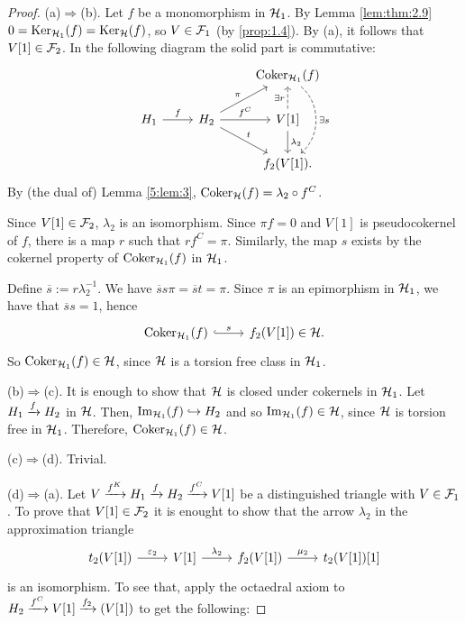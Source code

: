 \begin{proof}
  (a)$\Rightarrow$(b). Let $f$ be a monomorphism in $\mathcal{H}_1$. By Lemma \ref{lem:thm:2.9} $0=\operatorname{Ker}_{\mathcal{H}_1}(f)=\operatorname{Ker}_{\mathcal{H}}(f)$, so $V\in\mathcal{F}_1$ (by \ref{prop:1.4}). By (a), it follows that $V[1]\in\mathcal{F}_2$. In the following diagram the solid part is commutative:
  \begin{equation*}
    \begin{tikzcd}
      & & \Coker_{\clH_1}(f)\arrow[bend left=50,dashed]{dd}{\exists s}\\
      H_1\arrow{r}{f}
      & H_2\arrow{ur}{\pi}\arrow{r}{f^C}\arrow{dr}{t}
        & V[1]\arrow[dashed]{u}{\exists r}\arrow{d}{\lambda_2}\\
      & & f_2(V[1]).
    \end{tikzcd}
  \end{equation*}
  By (the dual of) Lemma \ref{5:lem:3}, $\operatorname{Coker}_{\mathcal{H}}(f)=\lambda_2\circ f^C$.

  Since $V[1]\in\mathcal{F}_2$, $\lambda_2$ is an isomorphism. Since $\pi f =0$ and $V[1]$ is pseudocokernel of $f$, there is a map $r$ such that $rf^C=\pi$. Similarly, the map $s$ exists by the cokernel property of $\operatorname{Coker}_{\mathcal{H}_1}(f)$ in $\mathcal{H}_1$.

  Define $\overline{s}:=r\lambda_2^{-1}$. We have $\overline{s}s\pi=\overline{s}t=\pi$. Since $\pi$ is an epimorphism in $\mathcal{H}_1$, we have that $\overline{s}s=1$, hence
  \begin{equation*}
    \begin{tikzcd}
      \Coker_{\clH_1}(f)\arrow[hook]{r}{s}
      & f_2(V[1])\in\clH.
    \end{tikzcd}
  \end{equation*}
  So $\operatorname{Coker}_{\mathcal{H}_1}(f)\in\mathcal{H}$, since $\mathcal{H}$ is a torsion free class in $\mathcal{H}_1$.

  \smallskip\noindent
  (b)$\Rightarrow$(c). It is enough to show that $\mathcal{H}$ is closed under cokernels in $\mathcal{H}_1$. Let $H_1\xrightarrow{f}H_2$ in $\mathcal{H}$. Then, $\operatorname{Im}_{\mathcal{H}_1}(f)\hookrightarrow H_2$ and so $\operatorname{Im}_{\mathcal{H}_1}(f)\in\mathcal{H}$, since $\mathcal{H}$ is torsion free in $\mathcal{H}_1$. Therefore, $\operatorname{Coker}_{\mathcal{H}_1}(f)\in\mathcal{H}$.

  \smallskip\noindent
  (c)$\Rightarrow$(d). Trivial.

  \smallskip\noindent
  (d)$\Rightarrow$(a). Let $V\xrightarrow{f^K}H_1\xrightarrow{f}H_2\xrightarrow{f^C}V[1]$ be a distinguished triangle with $V\in\mathcal{F}_1$. To prove that $V[1]\in\mathcal{F}_2$ it is enought to show that the arrow $\lambda_2$ in the approximation triangle
  \begin{equation*}
    \begin{tikzcd}
      t_2(V[1])\arrow{r}{\varepsilon_2}
      & V[1]\arrow{r}{\lambda_2}
        & f_2(V[1])\arrow{r}{\mu_2}
          & t_2(V[1])[1]
    \end{tikzcd}
  \end{equation*}
  is an isomorphism. To see that, apply the octaedral axiom to $H_2\xrightarrow{f^C}V[1]\xrightarrow{f_2}(V[1])$ to get the following:


\end{proof}
